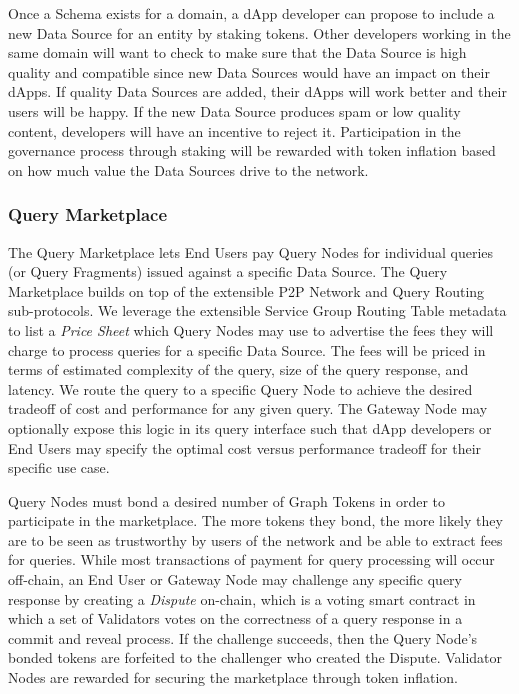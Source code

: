 \documentclass[12pt]{article}
\begin{document}
Once a Schema exists for a domain, a dApp developer can propose to include a new
Data Source for an entity by staking tokens. Other developers working in the
same domain will want to check to make sure that the Data Source is high quality
and compatible since new Data Sources would have an impact on their dApps. If
quality Data Sources are added, their dApps will work better and their users
will be happy. If the new Data Source produces spam or low quality content,
developers will have an incentive to reject it. Participation in the governance
process through staking will be rewarded with token inflation based on how much
value the Data Sources drive to the network.

\subsubsection*{Query Marketplace}

The Query Marketplace lets End Users pay Query Nodes for individual queries (or
Query Fragments) issued against a specific Data Source. The Query Marketplace
builds on top of the extensible P2P Network and Query Routing sub-protocols. We
leverage the extensible Service Group Routing Table metadata to list a
\textit{Price Sheet} which Query Nodes may use to advertise the fees they will
charge to process queries for a specific Data Source. The fees will be priced in
terms of estimated complexity of the query, size of the query response, and
latency. We route the query to a specific Query Node to achieve the desired
tradeoff of cost and performance for any given query. The Gateway Node may
optionally expose this logic in its query interface such that dApp developers or
End Users may specify the optimal cost versus performance tradeoff for their
specific use case.

Query Nodes must bond a desired number of Graph Tokens in order to participate
in the marketplace. The more tokens they bond, the more likely they are to be
seen as trustworthy by users of the network and be able to extract fees for
queries. While most transactions of payment for query processing will occur
off-chain, an End User or Gateway Node may challenge any specific query response
by creating a \textit{Dispute} on-chain, which is a voting smart contract in
which a set of Validators votes on the correctness of a query response in a
commit and reveal process. If the challenge succeeds, then the Query Node's
bonded tokens are forfeited to the challenger who created the Dispute. Validator
Nodes are rewarded for securing the marketplace through token inflation.
\end{document}
